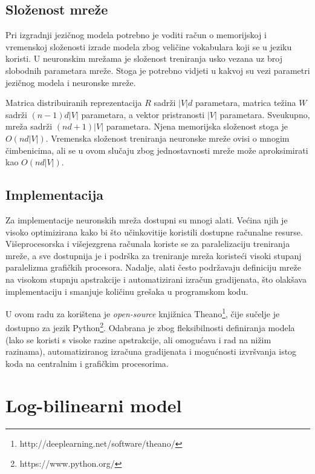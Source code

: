 \documentclass[times, utf8, diplomski, numeric]{fer}
\begin{document}
\section{Složenost mreže}

Pri izgradnji jezičnog modela potrebno je voditi račun o memorijskoj i vremenskoj složenosti izrade modela zbog veličine vokabulara koji se u jeziku koristi. U neuronskim mrežama je složenost treniranja usko vezana uz broj slobodnih parametara mreže. Stoga je potrebno vidjeti u kakvoj su vezi parametri jezičnog modela i neuronske mreže.

Matrica distribuiranih reprezentacija $R$ sadrži $|V| d$ parametara, matrica težina $W$ sadrži $(n - 1) d |V|$ parametara, a vektor pristranosti $|V|$ parametara. Sveukupno, mreža sadrži $(n d + 1) |V|$ parametara. Njena memorijska složenost stoga je $O(n d |V|)$. Vremenska složenost treniranja neuronske mreže ovisi o mnogim čimbenicima, ali se u ovom slučaju zbog jednostavnosti mreže može aproksimirati kao $O(n d |V|)$.

\section{Implementacija}

Za implementacije neuronskih mreža dostupni su mnogi alati. Većina njih je visoko optimizirana kako bi što učinkovitije koristili dostupne računalne resurse. Višeprocesorska i višejezgrena računala koriste se za paralelizaciju treniranja mreže, a sve dostupnija je i podrška za treniranje mreža koristeći visoki stupanj paralelizma grafičkih procesora. Nadalje, alati često podržavaju definiciju mreže na visokom stupnju apstrakcije i automatizirani izračun gradijenata, što olakšava implementaciju i smanjuje količinu grešaka u programskom kodu.

U ovom radu za korištena je \textit{open-source} knjižnica Theano\footnote{http://deeplearning.net/software/theano/}, čije sučelje je dostupno za jezik Python\footnote{https://www.python.org/}. Odabrana je zbog fleksibilnosti definiranja modela (lako se koristi s visoke razine apstrakcije, ali omogućava i rad na nižim razinama), automatiziranog izračuna gradijenata i mogućnosti izvršvanja istog koda na centralnim i grafičkim procesorima.

\chapter{Log-bilinearni model}
\end{document}
